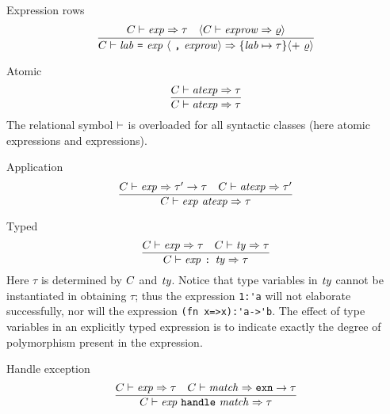 
\begin{sml-rule}{Expression rows}
\begin{equation}\label{rule:syntax-core:expression-row}
\vcenter{\infer{\C\ts\longlabexps\ra\{\lab\mapsto\tau\}\optional{+\ \varrho}}%
    {\C\ts\exp\ra\tau
      & \optional{\C\ts\labexps\ra\varrho}}}
\end{equation}
\end{sml-rule}


\begin{sml-rule}{Atomic}
\begin{equation}\label{rule:syntax-core:atomic}
\vcenter{\infer{\C\ts\atexp\ra\tau}{\C\ts\atexp\ra\tau}}
\end{equation}
The relational symbol $\vdash$ is overloaded for all syntactic classes (here
atomic expressions and expressions).
\end{sml-rule}

\begin{sml-rule}{Application}
\begin{equation}\label{rule:syntax-core:application}
  \vcenter{\infer{\C\ts\appexp\ra\tau}
    {\C\ts\exp\ra\tau'\rightarrow\tau
      & \C\ts\atexp\ra\tau'}}
\end{equation}
\end{sml-rule}

\begin{sml-rule}{Typed}
\begin{equation}\label{rule:syntax-core:typed}
  \vcenter{\infer{\C\ts\typedexp\ra\tau}{\C\ts\exp\ra\tau
  & \C\ts\ty\ra\tau}}
\end{equation}
Here $\tau$ is determined by $C$ and $\textit{ty\/}$. Notice that type variables
in $\textit{ty\/}$ cannot be instantiated in obtaining $\tau$; thus the expression
\verb+1:'a+ will not elaborate successfully, nor will the expression
\verb+(fn x=>x):'a->'b+.
The effect of type variables in an explicitly typed expression is
to indicate exactly the degree of polymorphism present in the expression.
\end{sml-rule}

\begin{sml-rule}{Handle exception}
\begin{equation}\label{rule:syntax-core:handle-exception}
  \vcenter{\infer{\C\ts\handlexp\ra\tau}
    {\C\ts\exp\ra\tau
      & \C\ts\match\ra\EXCN\rightarrow\tau}}
\end{equation}
\end{sml-rule}

